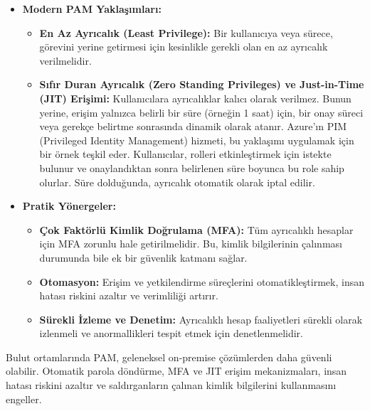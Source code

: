 \begin{itemize}
    \item \textbf{Modern PAM Yaklaşımları:}
    \begin{itemize}
        \item \textbf{En Az Ayrıcalık (Least Privilege):} Bir kullanıcıya veya sürece, görevini yerine getirmesi için kesinlikle gerekli olan en az ayrıcalık verilmelidir.
        \item \textbf{Sıfır Duran Ayrıcalık (Zero Standing Privileges) ve Just-in-Time (JIT) Erişimi:} Kullanıcılara ayrıcalıklar kalıcı olarak verilmez. Bunun yerine, erişim yalnızca belirli bir süre (örneğin 1 saat) için, bir onay süreci veya gerekçe belirtme sonrasında dinamik olarak atanır. Azure'ın PIM (Privileged Identity Management) hizmeti, bu yaklaşımı uygulamak için bir örnek teşkil eder. Kullanıcılar, rolleri etkinleştirmek için istekte bulunur ve onaylandıktan sonra belirlenen süre boyunca bu role sahip olurlar. Süre dolduğunda, ayrıcalık otomatik olarak iptal edilir.
    \end{itemize}
    \item \textbf{Pratik Yönergeler:}
    \begin{itemize}
        \item \textbf{Çok Faktörlü Kimlik Doğrulama (MFA):} Tüm ayrıcalıklı hesaplar için MFA zorunlu hale getirilmelidir. Bu, kimlik bilgilerinin çalınması durumunda bile ek bir güvenlik katmanı sağlar.
        \item \textbf{Otomasyon:} Erişim ve yetkilendirme süreçlerini otomatikleştirmek, insan hatası riskini azaltır ve verimliliği artırır.
        \item \textbf{Sürekli İzleme ve Denetim:} Ayrıcalıklı hesap faaliyetleri sürekli olarak izlenmeli ve anormallikleri tespit etmek için denetlenmelidir.
    \end{itemize}
\end{itemize}
Bulut ortamlarında PAM, geleneksel on-premise çözümlerden daha güvenli olabilir. Otomatik parola döndürme, MFA ve JIT erişim mekanizmaları, insan hatası riskini azaltır ve saldırganların çalınan kimlik bilgilerini kullanmasını engeller.

